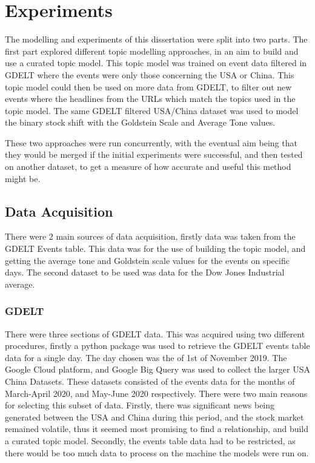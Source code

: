 \section{Experiments}
\label{experiments}
The modelling and experiments of this dissertation were split into two parts. The first part explored different topic modelling approaches, in an aim to build and use a curated topic model. This topic model was trained on event data filtered in GDELT where the events were only those concerning the USA or China. This topic model could then be used on more data from GDELT, to filter out new events where the headlines from the URLs which match the topics used in the topic model. The same GDELT filtered USA/China dataset was used to model the binary stock shift with the Goldstein Scale and Average Tone values. 

These two approaches were run concurrently, with the eventual aim being that they would be merged if the initial experiments were successful, and then tested on another dataset, to get a measure of how accurate and useful this method might be. 

\subsection{Data Acquisition}
There were 2 main sources of data acquisition, firstly data was taken from the GDELT Events table. This data was for the use of building the topic model, and getting the average tone and Goldstein scale values for the events on specific days. The second dataset to be used was data for the Dow Jones Industrial average.
\subsubsection{GDELT}
There were three sections of GDELT data. This was acquired using two different procedures, firstly a python package was used to retrieve the GDELT events table data for a single day. The day chosen was the of 1st of November 2019. The Google Cloud platform, and Google Big Query was used to collect the larger USA China Datasets. These datasets consisted of the events data for the months of March-April 2020, and May-June 2020 respectively. There were two main reasons for selecting this subset of data. Firstly, there was significant news being generated between the USA and China during this period, and the stock market remained volatile, thus it seemed most promising to find a relationship, and build a curated topic model. Secondly, the events table data had to be restricted, as there would be too much data to process on the machine the models were run on. 

